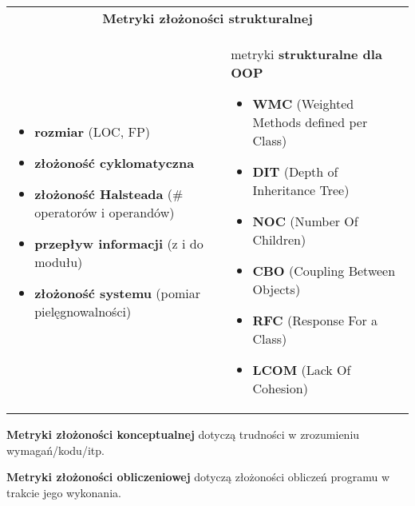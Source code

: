 \documentclass[../main.tex]{subfiles}
\begin{document}
    \begin{table}[H]
        \begin{center}
            \begin{tabular}{p{} p{8cm}}
                \multicolumn{2}{c}{  \textbf{Metryki złożoności strukturalnej}} \\
                \begin{itemize}
                    \item \textbf{rozmiar} (LOC, FP)
                    \item \textbf{złożoność cyklomatyczna}
                    \item \textbf{złożoność Halsteada} (\# operatorów i operandów)
                    \item \textbf{przepływ informacji} (z i do modułu)
                    \item \textbf{złożoność systemu} (pomiar pielęgnowalności)
                \end{itemize}
                &
                metryki \textbf{strukturalne dla OOP}
                \begin{itemize}
                    \item \textbf{WMC} (Weighted Methods defined per Class)
                    \item \textbf{DIT} (Depth of Inheritance Tree)
                    \item \textbf{NOC} (Number Of Children)
                    \item \textbf{CBO} (Coupling Between Objects)
                    \item \textbf{RFC} (Response For a Class)
                    \item \textbf{LCOM} (Lack Of Cohesion)
                \end{itemize} \\
            \end{tabular}
        \end{center}
    \end{table}

    \textbf{Metryki złożoności konceptualnej} dotyczą trudności w zrozumieniu wymagań/kodu/itp.

    \textbf{Metryki złożoności obliczeniowej} dotyczą złożoności obliczeń programu w trakcie jego wykonania.
\end{document}
